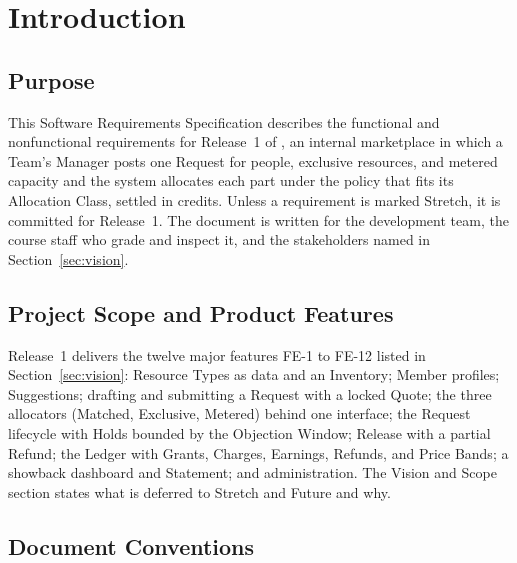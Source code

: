 \section{Introduction}\label{sec:intro}

\subsection{Purpose}

This Software Requirements Specification describes the functional and nonfunctional requirements for Release~1 of \SRSproduct, an internal marketplace in which a Team's Manager posts one Request for people, exclusive resources, and metered capacity and the system allocates each part under the policy that fits its Allocation Class, settled in credits. Unless a requirement is marked Stretch, it is committed for Release~1. The document is written for the development team, the course staff who grade and inspect it, and the stakeholders named in Section~\ref{sec:vision}.

\subsection{Project Scope and Product Features}

Release~1 delivers the twelve major features FE-1 to FE-12 listed in Section~\ref{sec:vision}: Resource Types as data and an Inventory; Member profiles; Suggestions; drafting and submitting a Request with a locked Quote; the three allocators (Matched, Exclusive, Metered) behind one interface; the Request lifecycle with Holds bounded by the Objection Window; Release with a partial Refund; the Ledger with Grants, Charges, Earnings, Refunds, and Price Bands; a showback dashboard and Statement; and administration. The Vision and Scope section states what is deferred to Stretch and Future and why.

\subsection{Document Conventions}


